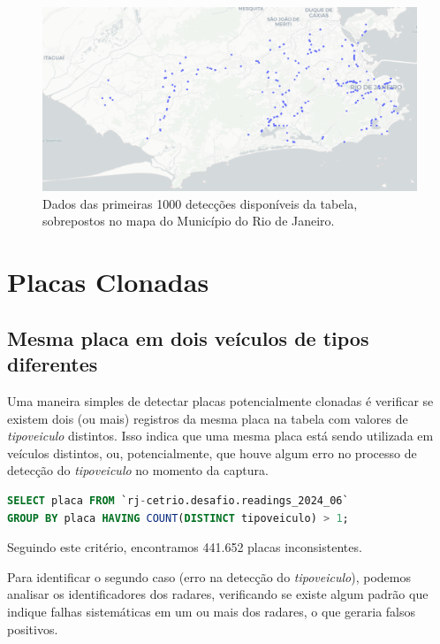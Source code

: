 \documentclass{article}
\begin{document}
\begin{figure}
    \centering
    \includegraphics[width=1.0\linewidth]{disp1000Map2.png}
    \caption{Dados das primeiras 1000 detecções disponíveis da tabela, sobrepostos no mapa do Município do Rio de Janeiro.}
    \label{fig:disp1000Map}
\end{figure}

\section{Placas Clonadas}

\subsection{Mesma placa em dois veículos de tipos diferentes}

Uma maneira simples de detectar placas potencialmente clonadas é verificar se existem dois (ou mais) registros da mesma placa na tabela com valores de \textit{tipoveiculo} distintos. Isso indica que uma mesma placa está sendo utilizada em veículos distintos, ou, potencialmente, que houve algum erro no processo de detecção do \textit{tipoveiculo} no momento da captura. 

\begin{lstlisting}[language=SQL,caption={Query SQL para identificar inconsistências de placa com tipo de veículo. São retornadas todas as placas as quais existem dois (ou mais) registros na tabela com valores de \textit{tipoveiculo} distintos.},label={lst:sqlquery5}]
SELECT placa FROM `rj-cetrio.desafio.readings_2024_06`
GROUP BY placa HAVING COUNT(DISTINCT tipoveiculo) > 1;
\end{lstlisting}

Seguindo este critério, encontramos 441.652 placas inconsistentes.

Para identificar o segundo caso (erro na detecção do \textit{tipoveiculo}), podemos analisar os identificadores dos radares, verificando se existe algum padrão que indique falhas sistemáticas em um ou mais dos radares, o que geraria falsos positivos.
\end{document}
